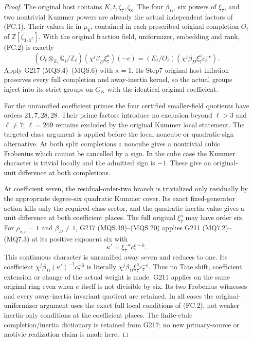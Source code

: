 \begin{proof}
The original host contains $K,t,\zeta_7,\zeta_8$.
The four $\beta_D$, six powers of $\xi_7$, and two nontrivial
Kummer powers are already the actual independent factors of (FC.1).
Their values lie in $\mu_6$, contained in each prescribed original
completion $O_\ell$ of $\mathbb Z[\zeta_{3\cdot2^h}]$.
With the original fraction field, uniformizer, embedding and rank,
(FC.2) is exactly
\[
 (O_\ell\otimes_{\mathbb Z_\ell}\mathbb Q_\ell/\mathbb Z_\ell)
                         (\chi^j\beta_D\xi_7^a)(-e)
   =(E_\ell/O_\ell)(\chi^j\beta_D\xi_7^a c_\ell^{-e}).
 \tag{MQSW.10}
\]
Apply G217 (MQS.4)--(MQS.6) with $\kappa=1$.
Its Step7 original-host inflation preserves every full
completion and away-inertia kernel, so the actual groups inject into
its strict groups on $G_K$ with the identical original coefficient.

For the unramified coefficient primes the four certified smaller-field
quotients have orders $21,7,28,28$. Their prime factors introduce no
exclusion beyond $\ell>3$ and $\ell\ne7$; $\ell=269$ remains excluded
by the original Kummer local statement. The targeted class argument
is applied before the local noncube or quadratic-sign alternative.
At both split completions a noncube gives a nontrivial cubic
Frobenius which cannot be cancelled by a sign. In the cube case the
Kummer character is trivial locally and the admitted sign is $-1$.
These give an original-unit difference at both completions.

At coefficient seven, the residual-order-two branch is trivialized
only residually by the appropriate degree-six quadratic Kummer cover.
Its exact fixed-generator action kills only the required class
sector, and the quadratic inertia value gives a unit difference at
both coefficient places. The full original $\xi_7^a$ may have order six.
For $\rho_{a,e}=1$ and $\beta_D\ne1$, G217 (MQS.19)--(MQS.20)
applies G211 (MQ7.2)--(MQ7.3) at its positive exponent six with
\[
                    \kappa'=\xi_7^{-a}c_7^{e-6}.
 \tag{MQSW.11}
\]
This continuous character is unramified away seven and reduces to one.
Its coefficient $\chi^j\beta_D(\kappa')^{-1}c_7^{-6}$ is literally
$\chi^j\beta_D\xi_7^a c_7^{-e}$. Thus no Tate shift, coefficient
extension or change of the actual weight is made. G211 applies on
the same original ring even when $e$ itself is not divisible by six.
Its two Frobenius witnesses and every away-inertia invariant quotient
are retained. In all cases the original-uniformizer argument uses
the exact full local conditions of (FC.2), not weaker inertia-only
conditions at the coefficient places.
The finite-etale completion/inertia dictionary is retained from G217;
no new primary-source or motivic realization claim is made here.


\end{proof}
